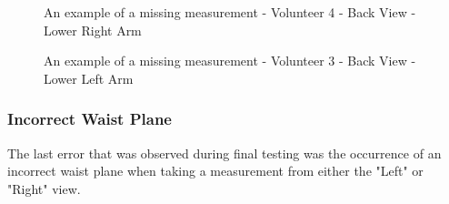 \begin{figure}[ht]
	\centering
	{%
		\setlength{\fboxsep}{0pt}%
		\setlength{\fboxrule}{0.5pt}%
		}
	\caption{An example of a missing measurement - Volunteer 4 - Back View - Lower Right Arm}
	\label{fig:volunteer4Back}
\end{figure}

\begin{figure}[ht]
	\centering
	{%
		\setlength{\fboxsep}{0pt}%
		\setlength{\fboxrule}{0.5pt}%
		}
	\caption{An example of a missing measurement - Volunteer 3 - Back View - Lower Left Arm}
	\label{fig:volunteer4Left}
\end{figure}

\subsubsection{Incorrect Waist Plane}
The last error that was observed during final testing was the occurrence of an incorrect waist plane when taking a measurement from either the "Left" or "Right" view. 

